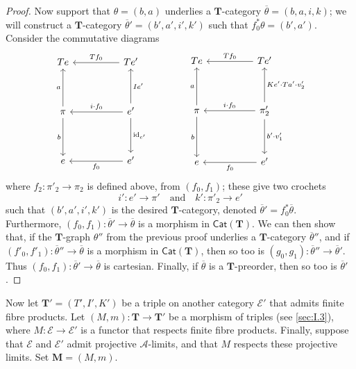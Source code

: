 \documentclass[fleqn]{article}
\newcommand{\id}{\mathrm{id}}
\newcommand{\TT}{\mathbf{T}}
\newcommand{\MM}{\mathbf{M}}
\newcommand{\textand}{\quad\text{and}\quad}
\newcommand{\cat}[1]{\mathcal{#1}}
\newcommand{\Cat}[1]{\mathsf{#1}}
\begin{document}
\begin{proof}
  Now support that $\theta=(b,a)$ underlies a $\TT$-category $\overline{\theta}=(b,a,i,k)$;
  we will construct a $\TT$-category $\overline{\theta}'=(b',a',i',k')$ such that $f_0^*\theta=(b',a')$.
  Consider the commutative diagrams
  \[
    \begin{tikzcd}[sep=huge]
      Te
    & Te'
        \ar[l,swap,"Tf_0"]
    \\\pi
        \ar[u,"a"]
        \ar[d,swap,"b"]
    & e'
        \ar[u,swap,"Ie'"]
        \ar[l,swap,"i\cdot f_0"]
        \ar[d,"\id_{e'}"]
    \\e
    & e'
        \ar[l,"f_0"]
    \end{tikzcd}
    \qquad\qquad
    \begin{tikzcd}[sep=huge]
      Te
    & Te'
        \ar[l,swap,"Tf_0"]
    \\\pi
        \ar[u,"a"]
        \ar[d,swap,"b"]
    & \pi'_2
        \ar[u,swap,"Ke'\cdot Ta'\cdot v'_2"]
        \ar[l,swap,"i\cdot f_0"]
        \ar[d,"b'\cdot v'_1"]
    \\e
    & e'
        \ar[l,"f_0"]
    \end{tikzcd}
  \]
  where $f_2\colon\pi'_2\to\pi_2$ is defined above, from $(f_0,f_1)$;
  these give two crochets
  \[
    i'\colon e'\to\pi'
    \textand
    k'\colon\pi'_2\to e'
  \]
  such that $(b',a',i',k')$ is the desired $\TT$-category, denoted $\overline{\theta}'=f_0^*\overline{\theta}$.
  Furthermore, $(f_0,f_1)\colon\overline{\theta}'\to\overline{\theta}$ is a morphism in $\Cat{Cat}(\TT)$.
  We can then show that, if the $\TT$-graph $\theta''$ from the previous proof underlies a $\TT$-category $\overline{\theta}''$, and if $(f'_0,f'_1)\colon\overline{\theta}''\to\overline{\theta}$ is a morphism in $\Cat{Cat}(\TT)$, then so too is $(g_0,g_1)\colon\overline{\theta}''\to\overline{\theta}'$.
  Thus $(f_0,f_1)\colon\overline{\theta}'\to\overline{\theta}$ is cartesian.
  Finally, if $\overline{\theta}$ is a $\TT$-preorder, then so too is $\overline{\theta}'$.
\end{proof}

Now let $\TT'=(T',I',K')$ be a triple on another category $\cat{E}'$ that admits finite fibre products.
Let $(M,m)\colon\TT\to\TT'$ be a morphism of triples (see \cref{sec:I.3}), where $M\colon\cat{E}\to\cat{E}'$ is a functor that respects finite fibre products.
Finally, suppose that $\cat{E}$ and $\cat{E}'$ admit projective $\cat{A}$-limits, and that $M$ respects these projective limits.
Set $\MM=(M,m)$.
\end{document}
